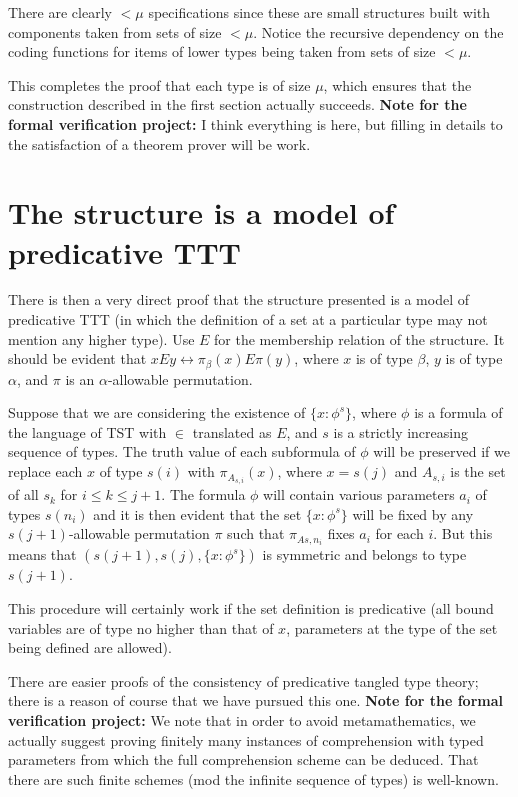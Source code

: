 There are clearly $<\mu$ specifications since these are small structures built with components taken from sets of size $<\mu$.  Notice the recursive dependency on the coding functions for items of lower types being taken from sets of size $<\mu$.

This completes the proof that each type is of size $\mu$, which ensures that the construction described in the first section actually succeeds.
{\bf Note for the formal verification project:}  I think everything is here, but filling in details to the satisfaction of a theorem prover will be work.
\newpage
\section{The structure is a model of predicative TTT}

There is then a very direct proof that the structure presented is a model of predicative TTT (in which the definition of a set at a particular type may not mention any higher type).  Use $E$ for the membership relation of the structure.  It should be evident that $x E y \leftrightarrow \pi_\beta(x) E \pi(y)$,
where $x$ is of type $\beta$, $y$ is of type $\alpha$, and $\pi$ is an $\alpha$-allowable permutation.

Suppose that we are considering the existence of $\{x : \phi^s\}$, where $\phi$ is a formula of the language of TST with $\in$ translated as $E$, and $s$ is a strictly increasing sequence of types.  The truth value of each subformula of $\phi$ will be preserved if we replace each $x$ of type $s(i)$ with $\pi_{A_{s,i}}(x)$, where
$x=s(j)$ and $A_{s,i}$ is the set of all $s_k$ for $i \leq k \leq j+1$.  The formula $\phi$ will contain various parameters $a_i$ of types $s(n_i)$ and it is then evident that the set $\{x : \phi^s\}$ will be fixed by any $s(j+1)$-allowable permutation $\pi$ such that $\pi_{A{s,n_i}}$ fixes $a_i$ for each $i$.  But this means that
$(s(j+1),s(j),\{x : \phi^s\})$ is symmetric and belongs to type $s(j+1)$.

This procedure will certainly work if the set definition is predicative (all bound variables are of type no higher than that of $x$, parameters at the type
of the set being defined are allowed).

There are easier proofs of the consistency of predicative tangled type theory;  there is a reason of course that we have pursued this one.
{\bf Note for the formal verification project:}  We note that in order to avoid metamathematics, we actually suggest proving finitely many instances of comprehension with typed parameters from which the full comprehension scheme can be deduced.  That there are such finite schemes (mod the infinite sequence of types) is well-known.


